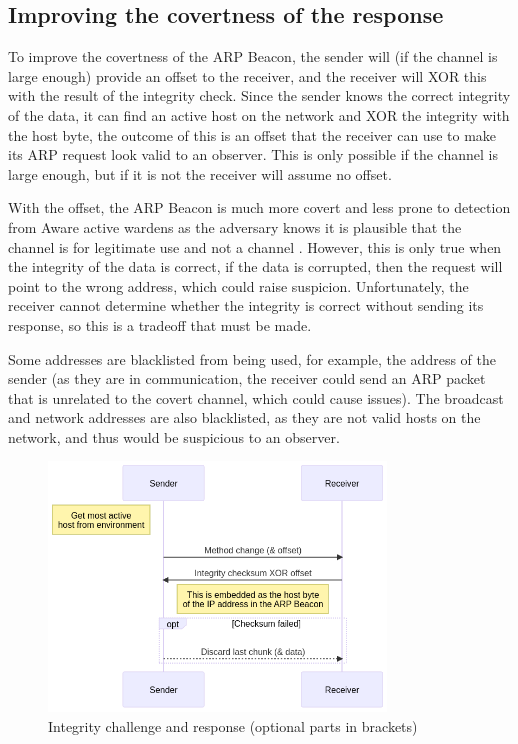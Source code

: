 \subsection{Improving the covertness of the response}
\label{sec:improving_arp}

To improve the covertness of the ARP Beacon, the sender will (if the channel is large enough) provide an offset to the receiver, and the receiver will XOR this with the result of the integrity check. Since the sender knows the correct integrity of the data, it can find an active host on the network and XOR the integrity with the host byte, the outcome of this is an offset that the receiver can use to make its ARP request look valid to an observer. This is only possible if the channel is large enough, but if it is not the receiver will assume no offset.

With the offset, the ARP Beacon is much more covert and less prone to detection from Aware active wardens as the adversary knows it is plausible that the channel is for legitimate use and not a channel \citep{GUCCA}. However, this is only true when the integrity of the data is correct, if the data is corrupted, then the request will point to the wrong address, which could raise suspicion. Unfortunately, the receiver cannot determine whether the integrity is correct without sending its response, so this is a tradeoff that must be made.

Some addresses are blacklisted from being used, for example, the address of the sender (as they are in communication, the receiver could send an ARP packet that is unrelated to the covert channel, which could cause issues). The broadcast and network addresses are also blacklisted, as they are not valid hosts on the network, and thus would be suspicious to an observer. 

\begin{figure}[h]
    \centering
    \includegraphics[width=0.8\textwidth]{fig/Integrity.png}
    \caption{Integrity challenge and response (optional parts in brackets)}
    \label{fig:integrity}
\end{figure}

